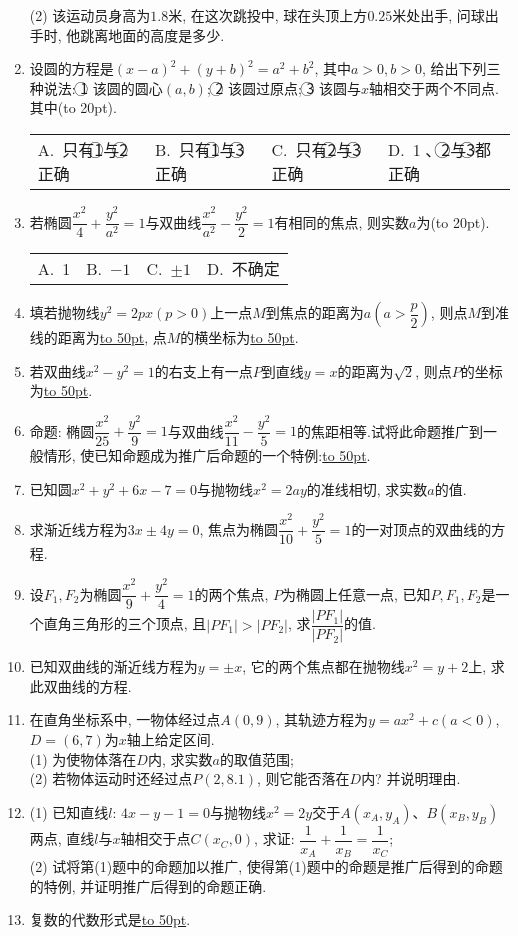 \documentclass[10pt,a4paper]{article}
\newcommand{\blank}[1]{\underline{\hbox to #1pt{}}}
\newcommand{\bracket}[1]{(\hbox to #1pt{})}
\newcommand{\fourch}[4]{\par\begin{tabular}{p{.23\textwidth}p{.23\textwidth}p{.23\textwidth}p{.23\textwidth}}
A.~#1 &B.~#2& C.~#3& D.~#4
\end{tabular}}
\begin{document}
\begin{enumerate}[1.]
(2) 该运动员身高为$1.8$米, 在这次跳投中, 球在头顶上方$0.25$米处出手, 问球出手时, 他跳离地面的高度是多少.
\item 设圆的方程是$(x-a)^2+(y+b)^2=a^2+b^2$, 其中$a>0,b>0$, 给出下列三种说法:
\textcircled{1} 该圆的圆心$(a,b)$;
\textcircled{2} 该圆过原点;
\textcircled{3} 该圆与$x$轴相交于两个不同点.
其中\bracket{20}.
\fourch{只有\textcircled{1}与\textcircled{2}正确}{只有\textcircled{1}与\textcircled{3}正确}{只有\textcircled{2}与\textcircled{3}正确}{\textcircled{1}、\textcircled{2}与\textcircled{3}都正确}
\item 若椭圆$\dfrac{x^2}4+\dfrac{y^2}{a^2}=1$与双曲线$\dfrac{x^2}{a^2}-\dfrac{y^2}2=1$有相同的焦点, 则实数$a$为\bracket{20}.
\fourch{1}{$-1$}{$\pm 1$}{不确定}
\item 填若抛物线$y^2=2px(p>0)$上一点$M$到焦点的距离为$a(a>\dfrac p2)$, 则点$M$到准线的距离为\blank{50}, 点$M$的横坐标为\blank{50}.
\item 若双曲线$x^2-y^2=1$的右支上有一点$P$到直线$y=x$的距离为$\sqrt 2$, 则点$P$的坐标为\blank{50}.
\item 命题: 椭圆$\dfrac{x^2}{25}+\dfrac{y^2}9=1$与双曲线$\dfrac{x^2}{11}-\dfrac{y^2}5=1$的焦距相等.试将此命题推广到一般情形, 使已知命题成为推广后命题的一个特例:\blank{50}.
\item 已知圆$x^2+y^2+6x-7=0$与抛物线$x^2=2ay$的准线相切, 求实数$a$的值.
\item 求渐近线方程为$3x\pm 4y=0$, 焦点为椭圆$\dfrac{x^2}{10}+\dfrac{y^2}5=1$的一对顶点的双曲线的方程.
\item 设$F_1,F_2$为椭圆$\dfrac{x^2}9+\dfrac{y^2}4=1$的两个焦点, $P$为椭圆上任意一点, 已知$P,F_1,F_2$是一个直角三角形的三个顶点, 且$|PF_1|>|PF_2|$, 求$\dfrac{|PF_1|}{|PF_2|}$的值.
\item 已知双曲线的渐近线方程为$y=\pm x$, 它的两个焦点都在抛物线$x^2=y+2$上, 求此双曲线的方程.
\item 在直角坐标系中, 一物体经过点$A(0,9)$, 其轨迹方程为$y=ax^2+c(a<0)$, $D=(6,7)$为$x$轴上给定区间.\\
(1) 为使物体落在$D$内, 求实数$a$的取值范围;\\
(2) 若物体运动时还经过点$P(2,8.1)$, 则它能否落在$D$内? 并说明理由.
\item (1) 已知直线$l$: $4x-y-1=0$与抛物线$x^2=2y$交于$A(x_A,y_A)$、$B(x_B,y_B)$两点, 直线$l$与$x$轴相交于点$C(x_C,0)$, 求证: $\dfrac 1{x_A}+\dfrac 1{x_B}=\dfrac 1{x_C}$;\\
(2) 试将第(1)题中的命题加以推广, 使得第(1)题中的命题是推广后得到的命题的特例, 并证明推广后得到的命题正确.
\item 复数的代数形式是\blank{50}.

\end{enumerate}
\end{document}

